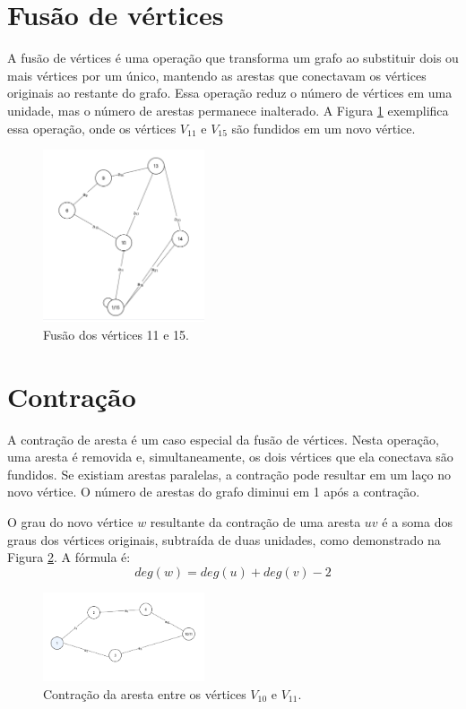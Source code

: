 \section{Fusão de vértices}\label{sec:fusao}
A fusão de vértices é uma operação que transforma um grafo ao substituir dois ou mais vértices por um único, mantendo as arestas que conectavam os vértices originais ao restante do grafo. Essa operação reduz o número de vértices em uma unidade, mas o número de arestas permanece inalterado. A Figura \ref{fig:fusao} exemplifica essa operação, onde os vértices $V_{11}$ e $V_{15}$ são fundidos em um novo vértice.

\begin{figure}[!h]
    \centering
    \includegraphics[width=0.425\textwidth]{figuras/fusao_novo_novo.png}
    \caption{Fusão dos vértices 11 e 15.}
    \label{fig:fusao}
\end{figure}

\section{Contração}\label{sec:contracao}
A contração de aresta é um caso especial da fusão de vértices. Nesta operação, uma aresta é removida e, simultaneamente, os dois vértices que ela conectava são fundidos. Se existiam arestas paralelas, a contração pode resultar em um laço no novo vértice. O número de arestas do grafo diminui em 1 após a contração.

O grau do novo vértice $w$ resultante da contração de uma aresta $uv$ é a soma dos graus dos vértices originais, subtraída de duas unidades, como demonstrado na Figura \ref{fig:contracao}. A fórmula é:
\[
    deg(w) = deg(u) + deg(v) - 2
\]

\begin{figure}[!h]
    \centering
    \includegraphics[width=0.425\textwidth]{figuras/contracao_novo_novo.png}
    \caption{Contração da aresta entre os vértices $V_{10}$ e $V_{11}$.}
    \label{fig:contracao}
\end{figure}

